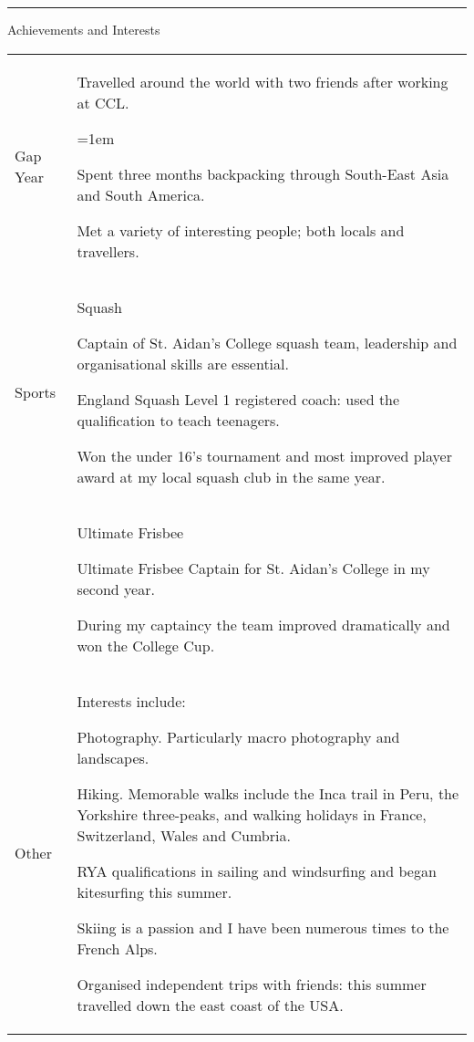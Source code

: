 \hrule\vspace{0.2cm}
\sc Achievements and Interests\rm
{}

\begin{tablehere}
  \begin{tabular}{p{\wa\textwidth} p{\wb\textwidth}}
    \sc Gap Year	&	Travelled around the world with two friends after working at CCL.
    \begin{list}	{}{\leftmargin=1em}
    \item Spent three months backpacking through South-East Asia and South America.
    \item Met a variety of interesting people; both locals and travellers.
    \end{list}\\
    \sc Sports		&	{\sc Squash}
    \begin{list}{}{\leftmargin=1em}
    \item Captain of St$.$ Aidan's College squash team, leadership and organisational skills are essential.
    \item England Squash Level 1 registered coach: used the qualification to teach teenagers.
    \item Won the under 16's tournament and most improved player award at my local squash club in the same year.
    \end{list}\\
    &	{\sc Ultimate Frisbee}
    \begin{list}{}{\leftmargin=1em}
    \item Ultimate Frisbee Captain for St$.$ Aidan's College in my second year.
    \item During my captaincy the team improved dramatically and won the College Cup.
    \end{list}\\
    \sc Other		&	Interests include:
    \begin{list}{}{\leftmargin=1em}
    \item Photography.  Particularly macro photography and landscapes.
    \item Hiking.  Memorable walks include the Inca trail in Peru, the Yorkshire three-peaks, and walking holidays in France, Switzerland, Wales and Cumbria.
    \item RYA qualifications in sailing and windsurfing and began kitesurfing this summer.
    \item Skiing is a passion and I have been numerous times to the French Alps.
    \item Organised independent trips with friends: this summer travelled down the east coast of the USA.
    \end{list}\\
  \end{tabular}
\end{tablehere}


